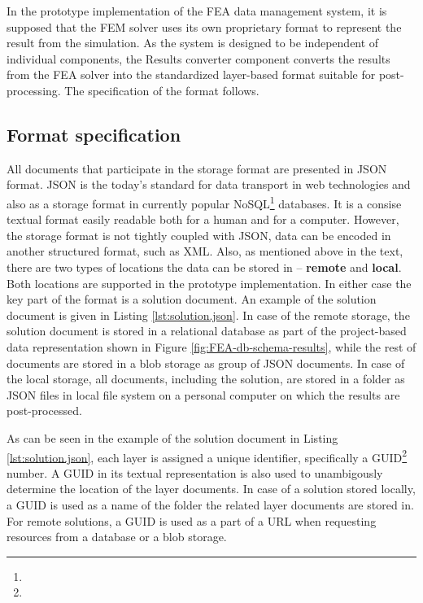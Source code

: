 In the prototype implementation of the FEA data management system, it is supposed that the FEM solver uses its own proprietary format to represent the result from the simulation. As the system is designed to be independent of individual components, the Results converter component converts the results from the FEA solver into the standardized layer-based format suitable for post-processing. The specification of the format follows.

\subsection{Format specification}

All documents that participate in the storage format are presented in JSON format. JSON is the today's standard for data transport in web technologies and also as a storage format in currently popular NoSQL\footnote{} databases. It is a consise textual format easily readable both for a human and for a computer. However, the storage format is not tightly coupled with JSON, data can be encoded in another structured format, such as XML. Also, as mentioned above in the text, there are two types of locations the data can be stored in -- \textbf{remote} and \textbf{local}. Both locations are supported in the prototype implementation. In either case the key part of the format is a solution document. An example of the solution document is given in Listing \ref{lst:solution.json}. In case of the remote storage, the solution document is stored in a relational database as part of the project-based data representation shown in Figure \ref{fig:FEA-db-schema-results}, while the rest of documents are stored in a blob storage as group of JSON documents. In case of the local storage, all documents, including the solution, are stored in a folder as JSON files in local file system on a personal computer on which the results are post-processed.

As can be seen in the example of the solution document in Listing \ref{lst:solution.json}, each layer is assigned a unique identifier, specifically a GUID\footnote{} number. A GUID in its textual representation is also used to unambigously determine the location of the layer documents. In case of a solution stored locally, a GUID is used as a name of the folder the related layer documents are stored in. For remote solutions, a GUID is used as a part of a URL when requesting resources from a database or a blob storage.

